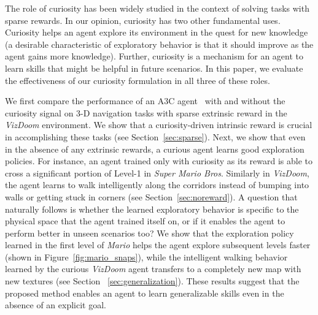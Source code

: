 \documentclass{article}
\begin{document}
The role of curiosity has been widely studied in the context of solving tasks with sparse rewards. In our opinion, curiosity has two other fundamental uses.
Curiosity helps an agent explore its environment in the quest for new knowledge (a desirable characteristic of exploratory behavior is that it should improve as the agent gains more knowledge). Further, curiosity is a mechanism for an agent to learn skills that might be helpful in future scenarios. In this paper, we evaluate the effectiveness of our curiosity formulation in all three of these roles.

We first compare the performance of an A3C agent~\cite{mnih2016asynchronous} with and without the curiosity signal on 3-D navigation tasks with sparse extrinsic reward in the {\em VizDoom} environment. We show that a curiosity-driven intrinsic reward is crucial in accomplishing these tasks (see Section~\ref{sec:sparse}). Next, we show that even in the absence of any extrinsic rewards, a curious agent learns good exploration policies. For instance, an agent trained only with curiosity as its reward is able to cross a significant portion of Level-1 in {\em Super Mario Bros}. Similarly in {\em VizDoom}, the agent learns to walk intelligently along the corridors instead of bumping into walls or getting stuck in corners (see Section~\ref{sec:noreward}). A question that naturally follows is whether the learned exploratory behavior is specific to the physical space that the agent trained itself on, or if it enables the agent to perform better in unseen scenarios too? We show that the exploration policy learned in the first level of {\em Mario} helps the agent explore subsequent levels faster (shown in Figure~\ref{fig:mario_snaps}), while the intelligent walking behavior learned by the curious {\em VizDoom} agent transfers to a completely new map with new textures (see Section ~\ref{sec:generalization}). These results suggest that the proposed method enables an agent to learn generalizable skills even in the absence of an explicit goal.
\end{document}
